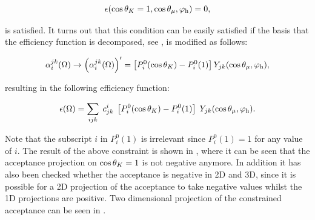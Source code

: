\begin{equation}
  \centering
  \epsilon(\cos\thetaK = 1, \cos\thetamu, \phihel) = 0,
  \label{eff_func_constr}
\end{equation}

\noindent is satisfied. It turns out that this condition can be easily satisfied if the basis that the
efficiency function is decomposed, see , is modified as follows:

\begin{align}
  \centering
   \effbase \to \parenthesis{\effbase}^\prime = \left[\legendre{i}{0}-P_i^0(1)\right] \spharm{j}{k},
  \label{eff_basis_transform}
  \end{align}

\noindent resulting in the following efficiency function:

\begin{align}
    \centering
  \epsilon(\Omega) = \sum_{ijk} \; \moment{i}{j}{k} \; \left[\legendre{i}{0}-P_i^0(1)\right] \; \spharm{j}{k}.
  \label{eff_func_new}
\end{align}

\noindent Note that the subscript $i$ in $P_i^0(1)$ is irrelevant since $P_i^0(1)=1$ for any value of $i$.
The result of the above constraint is shown in , where it can be seen that
the acceptance projection on $\cos\theta_{K}=1$ is not negative anymore. In addition it has also been checked
whether the acceptance is negative in 2D and 3D, since it is possible for a 2D projection of the acceptance
to take negative values whilst the 1D projections are positive. Two dimensional projection of the constrained
acceptance can be seen in .

